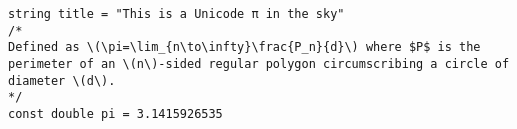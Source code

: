 \documentclass[varwidth, border={0.5cm 0.1cm 0.1cm 0.1cm}]{standalone}
\begin{document}
\begin{verbatim}
string title = "This is a Unicode π in the sky"
/*
Defined as \(\pi=\lim_{n\to\infty}\frac{P_n}{d}\) where $P$ is the perimeter of an \(n\)-sided regular polygon circumscribing a circle of diameter \(d\).
*/
const double pi = 3.1415926535
\end{verbatim}
\end{document}
